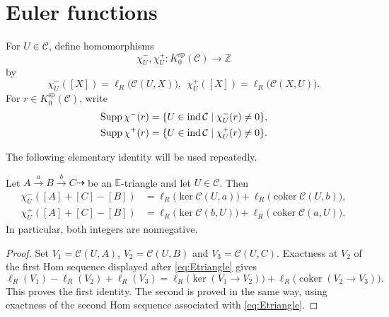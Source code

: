 \documentclass[11pt, twoside]{article}
\def\C{\mathcal{C}}
\def\E{\mathbb{E}}
\numberwithin{equation}{section}
\newcommand{\coker}{\operatorname{coker}}
\begin{document}

\section{Euler functions}\label{sec:euler}

For $U\in\C$, define homomorphisms
\[
 \chi_U^-,\chi_U^+\colon K_0^{\mathrm{sp}}(\C)\longrightarrow\mathbb Z
\]
by
\[
 \chi_U^-([X])=\ell_R\bigl(\C(U,X)\bigr),~~
 \chi_U^+([X])=\ell_R\bigl(\C(X,U)\bigr).
\]
For $r\in K_0^{\mathrm{sp}}(\C)$, write
\begin{align*}
 \Supp\chi^-(r)&=\{U\in\ind\C\mid\chi_U^-(r)\ne0\},\\
 \Supp\chi^+(r)&=\{U\in\ind\C\mid\chi_U^+(r)\ne0\}.
\end{align*}

The following elementary identity will be used repeatedly.

\begin{lemma}\label{lem:euler-defect}
Let $A\xrightarrow{a}B\xrightarrow{b}C\dashrightarrow$ be an
$\E$-triangle and let $U\in\C$.  Then
\begin{align*}
 \chi_U^-([A]+[C]-[B])
 &=\ell_R\bigl(\ker\C(U,a)\bigr)
   +\ell_R\bigl(\coker\C(U,b)\bigr),\\
 \chi_U^+([A]+[C]-[B])
 &=\ell_R\bigl(\ker\C(b,U)\bigr)
   +\ell_R\bigl(\coker\C(a,U)\bigr).
\end{align*}
In particular, both integers are nonnegative.
\end{lemma}

\begin{proof}
Set $V_1=\C(U,A)$, $V_2=\C(U,B)$ and $V_3=\C(U,C)$.  Exactness at
$V_2$ of the first Hom sequence displayed after \eqref{eq:Etriangle} gives
\[
 \ell_R(V_1)-\ell_R(V_2)+\ell_R(V_3)
 =\ell_R\bigl(\ker(V_1\to V_2)\bigr)
  +\ell_R\bigl(\coker(V_2\to V_3)\bigr).
\]
This proves the first identity.  The second is proved in the same way, using
exactness of the second Hom sequence associated with \eqref{eq:Etriangle}.
\end{proof}
\end{document}
